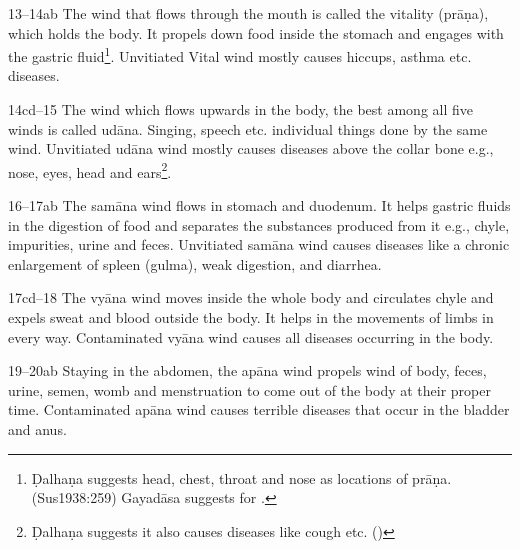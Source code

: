 \begin{translation}
\item[13--14ab] The wind that flows through the mouth is called the
vitality (prāṇa), which holds the body. It propels down food inside the
stomach and engages with the gastric fluid\footnote{ Ḍalhaṇa suggests
    head, chest, throat and nose as locations of prāṇa. (Sus1938:259)
    Gayadāsa suggests  for .}. Unvitiated Vital wind
    mostly causes hiccups, asthma etc. diseases.
        
\item[14cd--15] The wind which flows upwards in the body, the best among
all five winds is called udāna. Singing, speech etc. individual things
done by the same wind. Unvitiated udāna wind mostly causes diseases above
the collar bone e.g., nose, eyes, head and ears\footnote{ Ḍalhaṇa
    suggests it also causes diseases like cough etc. ()}.
            
\item [16--17ab] The samāna wind flows in stomach and duodenum. It helps
gastric fluids in the digestion of food and separates the substances
produced from it e.g., chyle, impurities, urine and feces. Unvitiated
samāna wind causes diseases like a chronic enlargement of spleen (gulma),
weak digestion, and diarrhea.
            
\item[17cd--18] The vyāna wind moves inside the whole body and circulates
chyle and expels sweat and blood outside the body. It helps in the
movements of limbs in every way. Contaminated vyāna wind causes all
diseases occurring in the body.
            
\item[19--20ab] Staying in the abdomen, the apāna wind propels wind of
body, feces, urine, semen, womb and menstruation to come out of the body
at their proper time. Contaminated apāna wind causes terrible diseases
that occur in the bladder and anus.
\end{translation}
